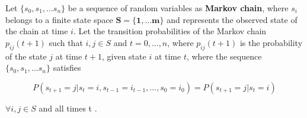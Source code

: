 \begin{definition}
	Let $\{s_0, s_1, \ldots s_n\}$ be a sequence of random variables as \textbf{Markov chain}, where $s_i$ belongs to a finite state space $\mathbf{S =\{1,\ldots m\}}$ and represents the observed state of the chain at time $i$. Let the transition probabilities of the Markov chain $p_{ij}(t+1)$ such that $i,j \in S$ and $t=0,\ldots, n$, where  $p_{ij}(t+1)$ is the probability of the state $j$ at time $t+1$, given state $i$ at time $t$, where the sequence $\{s_0, s_1, \ldots s_n\}$ satisfies
	
	\begin{equation*}
	P(s_{t+1}=j|s_{t}=i,s_{t-1}=i_{t-1},\ldots ,s_{0}=i_{0})=P(s_{t+1}=j|s_{t}=i)
	\end{equation*}

	
	$\forall i,j \in S$ and all times t \cite{bertsekas2002introduction,Billingsley1961,anderson1957statistical}.
\end{definition}
